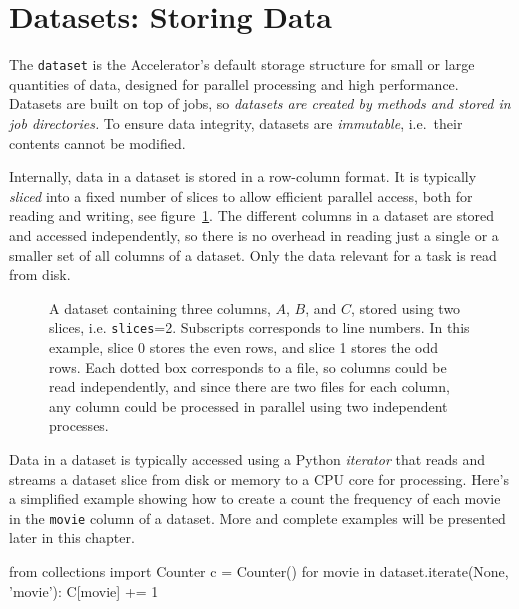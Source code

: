\clearpage

\section{Datasets: Storing Data}

The \texttt{dataset} is the Accelerator's default storage structure
for small or large quantities of data, designed for parallel
processing and high performance.  Datasets are built on top of jobs,
so \emph{datasets are created by methods and stored in job
directories.}  To ensure data integrity, datasets are
\textsl{immutable}, i.e.\ their contents cannot be modified.

Internally, data in a dataset is stored in a row-column format.  It is
typically \emph{sliced} into a fixed number of slices to allow
efficient parallel access, both for reading and writing, see
figure~\ref{fig:dataset}. The different columns in a dataset are
stored and accessed independently, so there is no overhead in reading
just a single or a smaller set of all columns of a dataset.  Only the
data relevant for a task is read from disk.

\begin{figure}[h!]
  \begin{center}
    \vspace{3ex}
    
    \vspace{1ex}
    \caption{A dataset containing three columns, $A$, $B$, and $C$,
      stored using two slices, i.e. \texttt{slices}=2.  Subscripts
      corresponds to line numbers.  In this example, slice 0 stores
      the even rows, and slice 1 stores the odd rows.  Each dotted box
      corresponds to a file, so columns could be read independently,
      and since there are two files for each column, any column could
      be processed in parallel using two independent processes.}
    \label{fig:dataset}
  \end{center}
\end{figure}

Data in a dataset is typically accessed using a Python \emph{iterator}
that reads and streams a dataset slice from disk or memory to a CPU
core for processing.  Here's a simplified example showing how to
create a count the frequency of each movie in the \texttt{movie}
column of a dataset.  More and complete examples will be presented
later in this chapter.

\begin{python}
from collections import Counter
c = Counter()
for movie in dataset.iterate(None, 'movie'):
    C[movie] += 1
\end{python}

